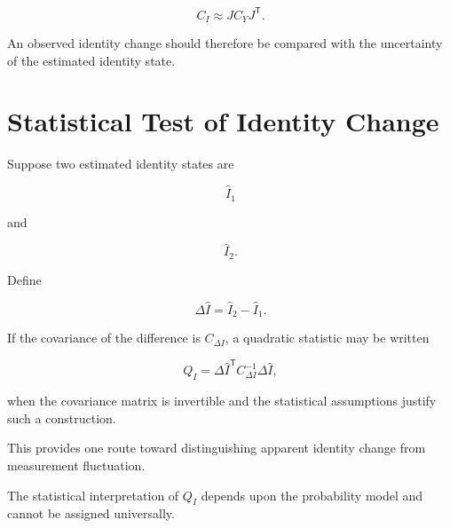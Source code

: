 \documentclass[12pt,oneside]{book}
\begin{document}
\begin{equation}
    C_I
    \approx
    J
    C_Y
    J^{\mathsf{T}}.
    \label{eq:identity-covariance}
\end{equation}

An observed identity change should therefore be compared with
the uncertainty of the estimated identity state.


\section{Statistical Test of Identity Change}
\label{sec:statistical-identity-test}

Suppose two estimated identity states are

\begin{equation}
    \widehat{I}_1
\end{equation}

and

\begin{equation}
    \widehat{I}_2.
\end{equation}

Define

\begin{equation}
    \Delta\widehat{I}
    =
    \widehat{I}_2
    -
    \widehat{I}_1.
\end{equation}

If the covariance of the difference is \(C_{\Delta I}\), a
quadratic statistic may be written

\begin{equation}
    Q_I
    =
    \Delta\widehat{I}^{\mathsf{T}}
    C_{\Delta I}^{-1}
    \Delta\widehat{I},
    \label{eq:identity-quadratic-statistic}
\end{equation}

when the covariance matrix is invertible and the statistical
assumptions justify such a construction.

This provides one route toward distinguishing apparent identity
change from measurement fluctuation.

The statistical interpretation of \(Q_I\) depends upon the
probability model and cannot be assigned universally.

\end{document}
